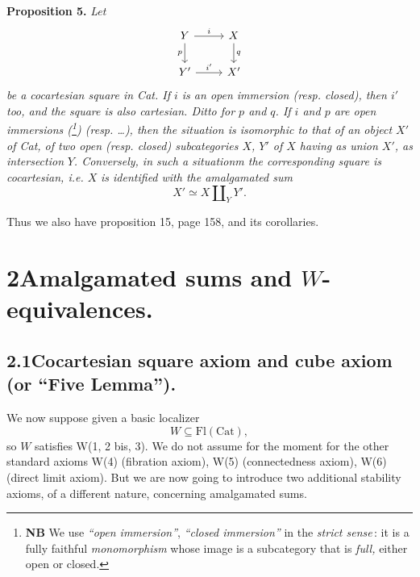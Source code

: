 \textbf{Proposition 5.} \textit{Let}
\[
\begin{tikzcd}
Y \arrow[r, "i"] \arrow[d, "p"'] & X \arrow[d, "q"] \\
Y' \arrow[r, "i'"] & X'
\end{tikzcd}
\]
\textit{be a cocartesian square in \textup{Cat}. If $i$ is an open immersion (resp. closed), then $i'$ too, and the square is also cartesian. Ditto for $p$ and $q$. If $i$ and $p$ are open immersions (\footnote{\textbf{NB} We use \textit{``open immersion''}, \textit{``closed immersion''} in the \textit{strict sense}\,: it is a fully faithful \textit{monomorphism} whose image is a subcategory that is \textit{full,} either open or closed.}) (resp. \dots), then the situation is isomorphic to that of an object $X'$ of \textup{Cat}, of two open (resp. closed) subcategories $X$, $Y'$ of $X$ having as union $X'$, as intersection} %
\textit{$Y$. Conversely, in such a situationm the corresponding square is cocartesian, i.e. $X$} %
 \textit{is identified with the amalgamated sum}
\[
X'\simeq X\amalg_{Y}Y'.
\]

Thus we also have proposition 15, page 158, and its corollaries.


\section*{2\quad Amalgamated sums and $W$-equivalences.}

\subsection*{2.1\quad Cocartesian square axiom and cube axiom (or ``Five Lemma'').}

We now suppose given a basic localizer
\[
W\subseteq\mathrm{Fl}(\mathrm{Cat}),
\]
so $W$ satisfies W(1, 2 bis, 3). We do not assume for the moment for the other standard axioms W(4) (fibration axiom), W(5) (connectedness axiom), W(6) (direct limit axiom). But we are now going to introduce two additional stability axioms, of a different nature, concerning amalgamated sums.

